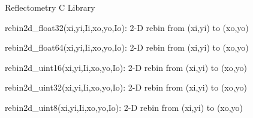\documentclass[letterpaper,10pt,english]{sphinxmanual}
\begin{document}
\label{api/reflmodule:module-refl1d.reflmodule}
Reflectometry C Library

\begin{fulllineitems}
\label{api/reflmodule:refl1d.reflmodule.rebin2d_float32}
rebin2d\_float32(xi,yi,Ii,xo,yo,Io): 2-D rebin from (xi,yi) to (xo,yo)

\end{fulllineitems}


\begin{fulllineitems}
\label{api/reflmodule:refl1d.reflmodule.rebin2d_float64}
rebin2d\_float64(xi,yi,Ii,xo,yo,Io): 2-D rebin from (xi,yi) to (xo,yo)

\end{fulllineitems}


\begin{fulllineitems}
\label{api/reflmodule:refl1d.reflmodule.rebin2d_uint16}
rebin2d\_uint16(xi,yi,Ii,xo,yo,Io): 2-D rebin from (xi,yi) to (xo,yo)

\end{fulllineitems}


\begin{fulllineitems}
\label{api/reflmodule:refl1d.reflmodule.rebin2d_uint32}
rebin2d\_uint32(xi,yi,Ii,xo,yo,Io): 2-D rebin from (xi,yi) to (xo,yo)

\end{fulllineitems}


\begin{fulllineitems}
\label{api/reflmodule:refl1d.reflmodule.rebin2d_uint8}
rebin2d\_uint8(xi,yi,Ii,xo,yo,Io): 2-D rebin from (xi,yi) to (xo,yo)

\end{fulllineitems}
\end{document}
